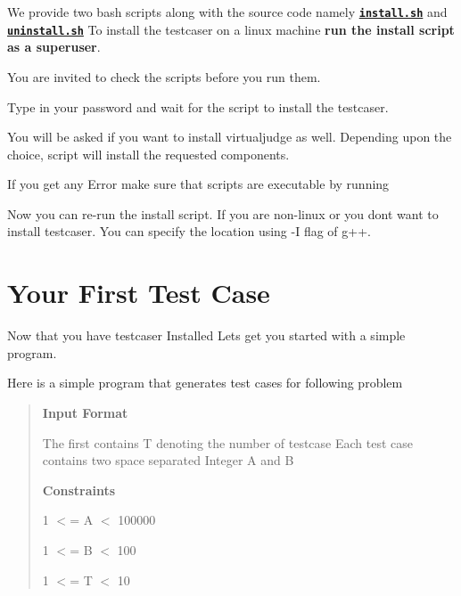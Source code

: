 We provide two bash scripts along with the source code namely 
\href{https://github.com/coder3101/testcaser/blob/master/install.sh}{\texttt{ {\bfseries{install.\+sh}}}} and 
\href{https://github.com/coder3101/testcaser/blob/master/uninstall.sh}{\texttt{ {\bfseries{uninstall.\+sh}}}} To install the testcaser on a linux machine {\bfseries{run the install script as a superuser}}.

You are invited to check the scripts before you run them.


\begin{DoxyCode}{0}
\end{DoxyCode}


Type in your password and wait for the script to install the testcaser.

You will be asked if you want to install {\ttfamily virtualjudge} as well. Depending upon the choice, script will install the requested components.

If you get any Error make sure that scripts are executable by running 
\begin{DoxyCode}{0}
\end{DoxyCode}


Now you can re-\/run the install script. If you are non-\/linux or you don\textquotesingle{}t want to install testcaser. You can specify the location using {\ttfamily -\/I} flag of {\ttfamily g++}. 

\hypertarget{index_started}{}\section{Your First Test Case}\label{index_started}
Now that you have testcaser Installed Let\textquotesingle{}s get you started with a simple program.

Here is a simple program that generates test cases for following problem \begin{quote}
{\bfseries{Input Format}}

The first contains T denoting the number of testcase Each test case contains two space separated Integer A and B

{\bfseries{Constraints}}

1 $<$= A $<$ 100000

1 $<$= B $<$ 100

1 $<$= T $<$ 10 \end{quote}



